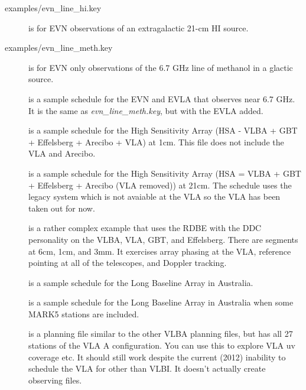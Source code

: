 \documentclass{report}
\begin{document}
\begin{description}
\item[
{examples/evn\_line\_hi.key}] is for EVN observations of an extragalactic
21-cm HI source.

\item[
{examples/evn\_line\_meth.key}] is for EVN only observations of the
6.7 GHz line of methanol in a glactic source.

\item[] is a
sample schedule for the EVN and EVLA that observes near 6.7 GHz.  It
is the same as {\sl evn\_line\_meth.key}, but with the EVLA added.

\item[] is a
sample schedule for the High Sensitivity Array (HSA - VLBA + GBT +
Effelsberg + Arecibo + VLA) at 1cm.  This file does not include the
VLA and Arecibo.

\item[] is a
sample schedule for the High Sensitivity Array (HSA = VLBA + GBT +
Effelsberg + Arecibo (VLA removed)) at 21cm.  The schedule uses the
legacy system which is not avaiable at the VLA so the VLA has been taken
out for now.

\item[] is
a rather complex example that uses the RDBE with the DDC personality
on the VLBA, VLA, GBT, and Effelsberg.  There are segments
at 6cm, 1cm, and 3mm.  It exercises array phasing 
at the VLA, reference pointing at all of the telescopes, and Doppler 
tracking.

\item[] is a
sample schedule for the Long Baseline Array in Australia.

\item[] is a
sample schedule for the Long Baseline Array in Australia when some
MARK5 stations are included.

\item[] is a
planning file similar to the other VLBA planning files, but has
all 27 stations of the VLA A configuration.  You can use this to
explore VLA uv coverage etc.  It should still work despite the current
(2012) inability to schedule the VLA for other than VLBI.  It doesn't
actually create observing files.


\end{description}
\end{document}
